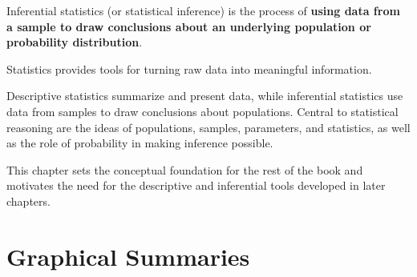 \documentclass[
  letterpaper,
  DIV=11,
  numbers=noendperiod]{scrreprt}
\begin{document}
Inferential statistics (or statistical inference) is the process of
\textbf{using data from a sample to draw conclusions about an underlying
population or probability distribution}.

\begin{tcolorbox}[enhanced jigsaw, coltitle=black, colbacktitle=quarto-callout-important-color!10!white, left=2mm, bottomrule=.15mm, bottomtitle=1mm, colback=white, titlerule=0mm, colframe=quarto-callout-important-color-frame, breakable, leftrule=.75mm, toptitle=1mm, opacitybacktitle=0.6, rightrule=.15mm, title=\textcolor{quarto-callout-important-color}{\faExclamation}\hspace{0.5em}{Chapter summary}, arc=.35mm, opacityback=0, toprule=.15mm]

Statistics provides tools for turning raw data into meaningful
information.

Descriptive statistics summarize and present data, while inferential
statistics use data from samples to draw conclusions about populations.
Central to statistical reasoning are the ideas of populations, samples,
parameters, and statistics, as well as the role of probability in making
inference possible.

This chapter sets the conceptual foundation for the rest of the book and
motivates the need for the descriptive and inferential tools developed
in later chapters.

\end{tcolorbox}


\chapter{Graphical Summaries}\label{ch2}
\end{document}
